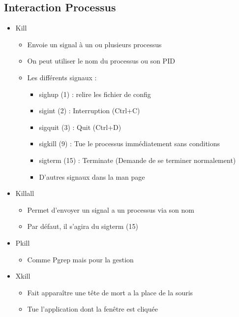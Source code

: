 \documentclass[a4paper]{article}
\begin{document}
      \subsection{Interaction Processus}
      \begin{itemize}[label = \textbullet, font = \Large]
        \item Kill
        \begin{itemize}[label=, font=\scriptsize] 
          \item Envoie un signal à un ou plusieurs processus
          \item On peut utiliser le nom du processus ou son PID
          \item Les différents signaux :
          \begin{itemize}
            \item sighup (1) : relire les fichier de config
            \item sigint (2) : Interruption (Ctrl+C)
            \item sigquit (3) : Quit (Ctrl+D)
            \item sigkill (9) : Tue le processus immédiatement sans conditions
            \item sigterm (15) : Terminate (Demande de se terminer normalement)
            \item D'autres signaux dans la man page
          \end{itemize}
        \end{itemize} 
        \item Killall
        \begin{itemize}[label=, font=\scriptsize] 
          \item Permet d'envoyer un signal a un processus via son nom
          \item Par défaut, il s'agira du sigterm (15)
        \end{itemize}
        \item Pkill
        \begin{itemize}[label=, font=\scriptsize] 
          \item Comme Pgrep mais pour la gestion
        \end{itemize}
        \item Xkill
        \begin{itemize}[label=, font=\scriptsize] 
          \item Fait apparaître une tête de mort a la place de la souris
          \item Tue l'application dont la fenêtre est cliquée
        \end{itemize}
      \end{itemize}
\end{document}
